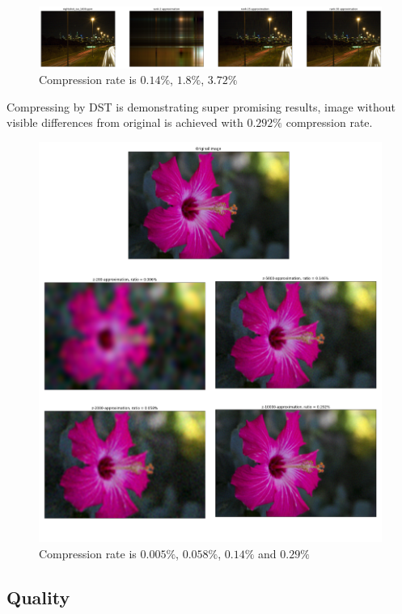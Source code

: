 \begin{figure}[H]
  \centering
  \includegraphics[width=\linewidth]{nightshot_iso_1600.png}
  \caption{Compression rate is $0.14\%$, $1.8\%$, $3.72\%$}
  \label{fig:exmp_8}
\end{figure}

Compressing by DST is demonstrating super promising results, image without visible differences from original is achieved with $0.292\%$ compression rate. 

\begin{figure}[H]
  \centering
  \includegraphics[width=0.9\linewidth]{dst_benchmark_1.png}
  \caption{Compression rate is $0.005\%$, $0.058\%$, $0.14\%$ and $0.29\%$}
  \label{fig:exmp_9}
\end{figure}

\subsection{Quality}

